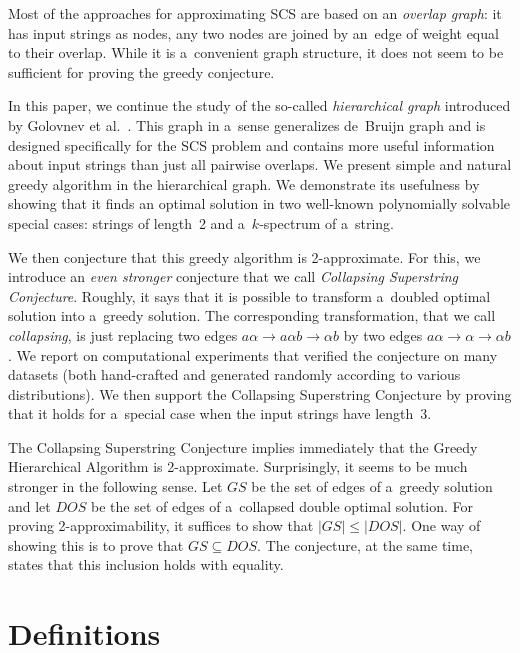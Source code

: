 \documentclass[11pt,letterpaper]{article}
\begin{document}
Most of the approaches for approximating SCS are based on an
{\em overlap graph}: it has input strings as nodes, any two nodes 
are joined by an~edge of weight equal to their overlap.  
While it is a~convenient graph structure, it does not seem to be sufficient
for proving the greedy conjecture.

In this paper, we continue the study of the so-called {\em hierarchical graph}
introduced by Golovnev et al.~\cite{}. This graph in a~sense generalizes de~Bruijn graph and is designed specifically 
for the SCS problem and contains more useful information about input strings
than just all pairwise overlaps. We present simple and natural greedy algorithm
in the hierarchical graph. 
We demonstrate its usefulness by showing that it finds an optimal solution 
in two well-known polynomially solvable special cases: strings of length~2 and
a~$k$-spectrum of a~string.

We then conjecture that this greedy algorithm is 2-approximate. For this, we introduce an {\em even stronger} conjecture that we call 
{\em Collapsing Superstring Conjecture}. 
Roughly, it says that it is possible to transform a~doubled optimal 
solution into a~greedy solution. 
The corresponding transformation, that we call {\em collapsing}, 
is just replacing two edges $a\alpha \to a\alpha b \to \alpha b$ 
by two edges $a\alpha \to \alpha \to \alpha b$. 
We report on computational experiments that verified the 
conjecture on many datasets (both hand-crafted and generated randomly
according to various distributions). 
We then support the Collapsing Superstring Conjecture by 
proving that it holds for a~special case when the input strings have length~3.

The Collapsing Superstring Conjecture implies immediately that the Greedy
Hierarchical Algorithm is 2-approximate. Surprisingly, it seems to be much
stronger in the following sense. Let $GS$ be the set of edges of a~greedy
solution and let $DOS$ be the set of edges of a~collapsed double optimal
solution. For proving 2-approximability, it suffices to show that $|GS| \le |DOS|$. 
One way of showing this is to prove that $GS \subseteq DOS$. 
The conjecture, at the same time, states that this inclusion holds with equality.


\section{Definitions}
\end{document}

